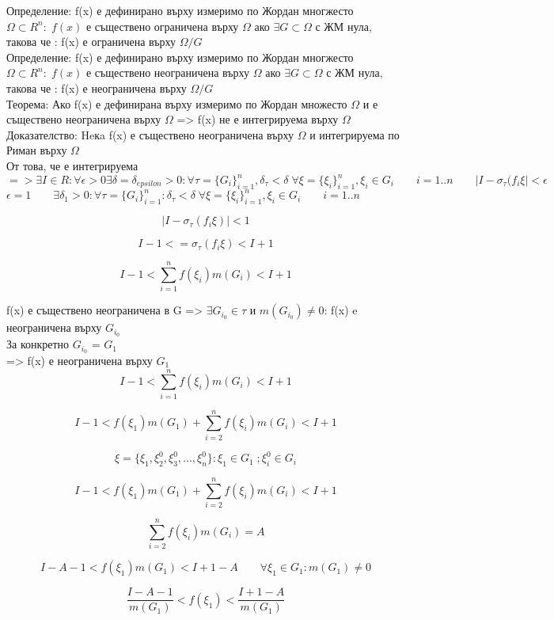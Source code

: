 \documentclass{article}
\begin{document}
Определение: f(x) е дефинирано върху измеримо по Жордан многжесто $\Omega \subset R^n: \; f(x) $ е съществено ограничена върху $\Omega$ ако $\exists G \subset \Omega$ с ЖМ нула, такова че : f(x) е ограничена върху $\Omega/G$ 
\\
Определение: f(x) е дефинирано върху измеримо по Жордан многжесто $\Omega \subset R^n: \; f(x) $ е съществено неограничена върху $\Omega$ ако $\exists G \subset \Omega$ с ЖМ нула, такова че : f(x) е неограничена върху $\Omega/G$\\

Теорема: Ако f(x) е дефинирана върху измеримо по Жордан множесто $\Omega$ и е съществено неограничена върху $\Omega$ => f(x) не е интегрируема върху $\Omega$\\

Доказателство: Heкa f(x) е съществено неограничена върху $\Omega$ и интегрируема по Риман върху $\Omega$ \\

От това, че е интегрируема $ => \exists I \in R: \forall \epsilon > 0 \exists \delta = \delta_{epsilon} > 0: \forall \tau = \{G_{i}\}_{i=1}^n, \delta_{\tau} < \delta \; \forall \xi=\{\xi_{i}\}_{i=1}^n, \xi_{i} \in G_{i} \qquad i = 1..n \qquad |I - \sigma_{\tau}(f_{i} \xi| < \epsilon$ \\

$ \epsilon = 1 \qquad \exists \delta_{1} > 0 : \forall \tau = \{G_{i}\}_{i=1}^n : \delta_{\tau} < \delta \; \forall \xi=\{\xi_{i}\}_{i=1}^n, \xi_{i} \in G_{i} \qquad i = 1..n $

$$ |I- \sigma_{\tau}(f_{i} \xi) | < 1 $$

$$ I - 1<= \sigma_{\tau}(f_{i} \xi) < I + 1 $$

$$ I - 1< \sum_{i=1}^{n} f(\xi_{i})m(G_{i}) < I + 1 $$

f(x) е съществено неограничена в G => $ \exists G_{i_{0}} \in \tau$ и $m(G_{i_{0}}) \neq 0 $: f(x) e неограничена върху $G_{i_{0}}$ \\

За конкретно $G_{i_{0}}$ = $G_{1}$ \\

=> f(x) е неограничена върху $G_{1}$ \\

$$ I - 1< \sum_{i=1}^{n} f(\xi_{i})m(G_{i}) < I + 1 $$

$$ I - 1< f(\xi_{1})m(G_{1})  + \sum_{i=2}^{n} f(\xi_{i})m(G_{i}) < I + 1 $$

$$ \xi = \{ \xi_{1}, \xi_{2}^0,\xi_{3}^0, ... , \xi_{n}^0\} : \xi_{1} \in G_{1} \; ; \xi_{i}^0 \in G_{i} $$

$$ I - 1< f(\xi_{1})m(G_{1})  + \sum_{i=2}^{n} f(\xi_{i})m(G_{i}) < I + 1 $$

$$ \sum_{i=2}^{n} f(\xi_{i})m(G_{i}) = A $$

$$ I - A - 1< f(\xi_{1})m(G_{1}) < I + 1 - A \qquad \forall \xi_{1} \in G_{1} : m(G_{1}) \neq 0 $$

$$ \frac{I - A - 1}{m(G_{1})}< f(\xi_{1}) < \frac{I + 1 - A}{m(G_{1})} $$
\end{document}
